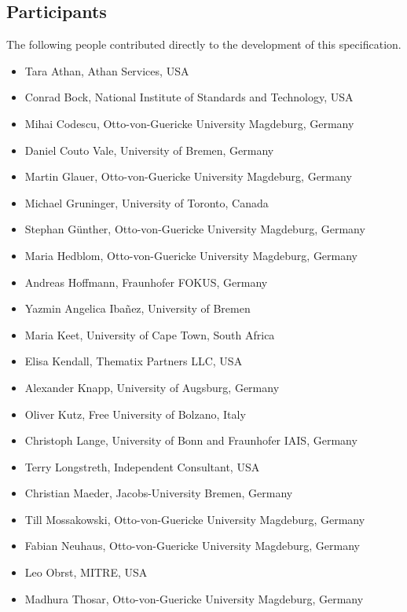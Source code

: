 \documentclass[10pt,fleqn,%
\ifpretendfinal
final%
\else
draft%
\fi,
]{scrreprt}
\begin{document}
\subsection{Participants}
The following people contributed directly to the development of this specification. 
	\begin{itemize}
	\item Tara Athan, Athan Services, USA 
	\item Conrad Bock, National Institute of Standards and Technology, USA
	\item Mihai Codescu, Otto-von-Guericke University Magdeburg, Germany 
        \item Daniel Couto Vale, University of Bremen, Germany
        \item Martin Glauer, Otto-von-Guericke University Magdeburg, Germany
	\item Michael Gruninger, University of Toronto, Canada  
        \item Stephan Günther, Otto-von-Guericke University Magdeburg, Germany
        \item Maria Hedblom, Otto-von-Guericke University Magdeburg, Germany
	\item Andreas Hoffmann, Fraunhofer FOKUS, Germany 
        \item Yazmin Angelica Iba\~nez, University of Bremen
	\item Maria Keet, University of Cape Town, South Africa 
	\item Elisa Kendall, Thematix Partners LLC, USA	
        \item Alexander Knapp, University of Augsburg, Germany
	\item Oliver Kutz, Free University of Bolzano, Italy
	\item Christoph Lange, University of Bonn and Fraunhofer IAIS, Germany
	\item Terry Longstreth, Independent Consultant, USA 	
        \item Christian Maeder, Jacobs-University Bremen, Germany
	\item Till Mossakowski, Otto-von-Guericke University Magdeburg, Germany  	
	\item Fabian Neuhaus, Otto-von-Guericke University Magdeburg, Germany  	  
	\item Leo Obrst, MITRE, USA
        \item Madhura Thosar, Otto-von-Guericke University Magdeburg, Germany
   
	\end{itemize}
%	
\end{document}
